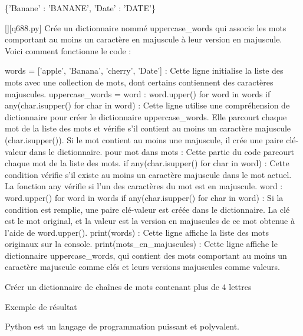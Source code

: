 \{'Banane' : 'BANANE', 'Date' : 'DATE'\}
        \par
        \begin{solution}
            \renewcommand{\nomfichier}{q688.py}
            \pythonfile{\chemincode \nomfichier}[][\nomfichier]
            Crée un dictionnaire nommé uppercase_words qui associe les mots comportant au moins un caractère en majuscule à leur version en majuscule. Voici comment fonctionne le code :

    words = ['apple', 'Banana', 'cherry', 'Date'] : Cette ligne initialise la liste des mots avec une collection de mots, dont certains contiennent des caractères majuscules.
    uppercase_words = {word : word.upper() for word in words if any(char.isupper() for char in word)} : Cette ligne utilise une compréhension de dictionnaire pour créer le dictionnaire uppercase_words. Elle parcourt chaque mot de la liste des mots et vérifie s'il contient au moins un caractère majuscule (char.isupper()). Si le mot contient au moins une majuscule, il crée une paire clé-valeur dans le dictionnaire.
        pour mot dans mots : Cette partie du code parcourt chaque mot de la liste des mots.
        if any(char.isupper() for char in word) : Cette condition vérifie s'il existe au moins un caractère majuscule dans le mot actuel. La fonction any vérifie si l'un des caractères du mot est en majuscule.
        {word : word.upper() for word in words if any(char.isupper() for char in word)} : Si la condition est remplie, une paire clé-valeur est créée dans le dictionnaire. La clé est le mot original, et la valeur est la version en majuscules de ce mot obtenue à l'aide de word.upper().
    print(words) : Cette ligne affiche la liste des mots originaux sur la console.
    print(mots_en_majuscules) : Cette ligne affiche le dictionnaire uppercase_words, qui contient des mots comportant au moins un caractère majuscule comme clés et leurs versions majuscules comme valeurs.
        \end{solution}
        

        \question
        Créer un dictionnaire de chaînes de mots contenant plus de 4 lettres

Exemple de résultat

Python est un langage de programmation puissant et polyvalent.

